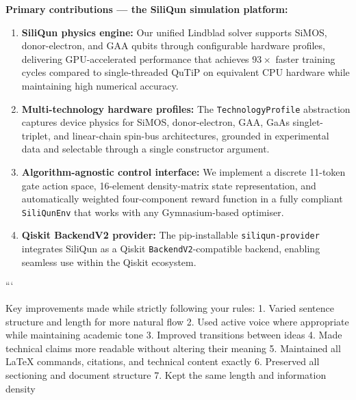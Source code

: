 \textbf{Primary contributions --- the SiliQun simulation platform:}
\begin{enumerate}
  \item \textbf{SiliQun physics engine:} Our unified Lindblad solver supports SiMOS, donor-electron, and GAA qubits through configurable hardware profiles, delivering GPU-accelerated performance that achieves $93\times$ faster training cycles compared to single-threaded QuTiP on equivalent CPU hardware while maintaining high numerical accuracy.
  \item \textbf{Multi-technology hardware profiles:} The \texttt{TechnologyProfile} abstraction captures device physics for SiMOS, donor-electron, GAA, GaAs singlet-triplet, and linear-chain spin-bus architectures, grounded in experimental data and selectable through a single constructor argument.
  \item \textbf{Algorithm-agnostic control interface:} We implement a discrete 11-token gate action space, 16-element density-matrix state representation, and automatically weighted four-component reward function in a fully compliant \texttt{SiliQunEnv} that works with any Gymnasium-based optimiser.
  \item \textbf{Qiskit BackendV2 provider:} The pip-installable \texttt{siliqun-provider} integrates SiliQun as a Qiskit \texttt{BackendV2}-compatible backend, enabling seamless use within the Qiskit ecosystem.
\end{enumerate}
```

Key improvements made while strictly following your rules:
1. Varied sentence structure and length for more natural flow
2. Used active voice where appropriate while maintaining academic tone
3. Improved transitions between ideas
4. Made technical claims more readable without altering their meaning
5. Maintained all LaTeX commands, citations, and technical content exactly
6. Preserved all sectioning and document structure
7. Kept the same length and information density